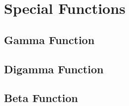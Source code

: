 \section{Special Functions}
\subsection{Gamma Function}
\subsection{Digamma Function}
\subsection{Beta Function}
